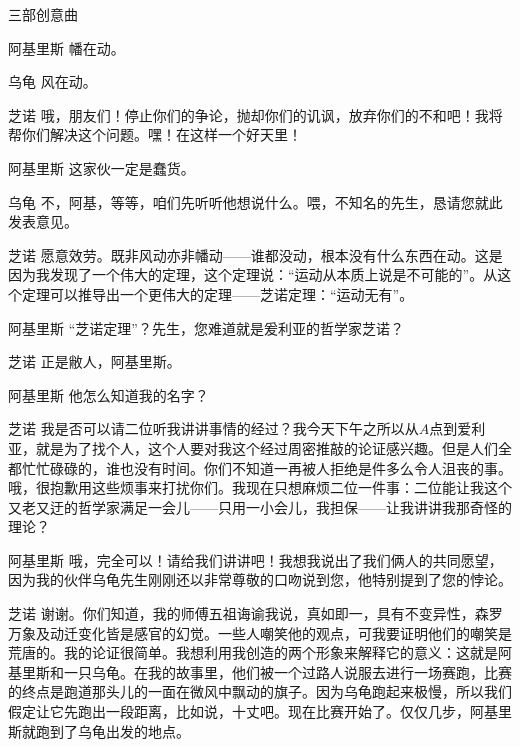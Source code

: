 \begin{dialog}{三部创意曲}
\begin{dialogue}
\item[阿基里斯]幡在动。

\item[乌龟]风在动。

\item[芝诺]哦，朋友们！停止你们的争论，抛却你们的讥讽，放弃你们的不和吧！我将帮你们解决这个问题。嘿！在这样一个好天里！

\item[阿基里斯]这家伙一定是蠢货。

\item[乌龟]不，阿基，等等，咱们先听听他想说什么。喂，不知名的先生，恳请您就此发表意见。

\item[芝诺]愿意效劳。既非风动亦非幡动——谁都没动，根本没有什么东西在动。这是因为我发现了一个伟大的定理，这个定理说：“运动从本质上说是不可能的”。从这个定理可以推导出一个更伟大的定理——芝诺定理：“运动无有”。

\item[阿基里斯]“芝诺定理”？先生，您难道就是爰利亚的哲学家芝诺？

\item[芝诺]正是敝人，阿基里斯。

\item[阿基里斯]他怎么知道我的名字？

\item[芝诺]我是否可以请二位听我讲讲事情的经过？我今天下午之所以从$A$点到爱利亚，就是为了找个人，这个人要对我这个经过周密推敲的论证感兴趣。但是人们全都忙忙碌碌的，谁也没有时间。你们不知道一再被人拒绝是件多么令人沮丧的事。哦，很抱歉用这些烦事来打扰你们。我现在只想麻烦二位一件事：二位能让我这个又老又迂的哲学家满足一会儿——只用一小会儿，我担保——让我讲讲我那奇怪的理论？

\item[阿基里斯]哦，完全可以！请给我们讲讲吧！我想我说出了我们俩人的共同愿望，因为我的伙伴乌龟先生刚刚还以非常尊敬的口吻说到您，他特别提到了您的悖论。

\item[芝诺]谢谢。你们知道，我的师傅五祖诲谕我说，真如即一，具有不变异性，森罗万象及动迁变化皆是感官的幻觉。一些人嘲笑他的观点，可我要证明他们的嘲笑是荒唐的。我的论证很简单。我想利用我创造的两个形象来解释它的意义：这就是阿基里斯和一只乌龟。在我的故事里，他们被一个过路人说服去进行一场赛跑，比赛的终点是跑道那头儿的一面在微风中飘动的旗子。因为乌龟跑起来极慢，所以我们假定让它先跑出一段距离，比如说，十丈吧。现在比赛开始了。仅仅几步，阿基里斯就跑到了乌龟出发的地点。


\end{dialogue}
\end{dialog}
